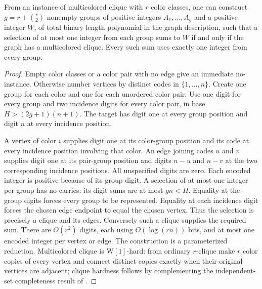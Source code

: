 \begin{lemma}\label{lem:groupsum59}
From an instance of multicolored clique with $r$ color classes, one can construct $g=r+\binom r2$ nonempty groups of positive integers $A_1,\ldots,A_g$ and a positive integer $W$, of total binary length polynomial in the graph description, such that a selection of at most one integer from each group sums to $W$ if and only if the graph has a multicolored clique. Every such sum uses exactly one integer from every group.
\end{lemma}
\begin{proof}
Empty color classes or a color pair with no edge give an immediate no-instance. Otherwise number vertices by distinct codes in $\{1,\ldots,n\}$. Create one group for each color and one for each unordered color pair. Use one digit for every group and two incidence digits for every color pair, in base $H>(2g+1)(n+1)$. The target has digit one at every group position and digit $n$ at every incidence position.

A vertex of color $i$ supplies digit one at its color-group position and its code at every incidence position involving that color. An edge joining codes $u$ and $v$ supplies digit one at its pair-group position and digits $n-u$ and $n-v$ at the two corresponding incidence positions. All unspecified digits are zero. Each encoded integer is positive because of its group digit. A selection of at most one integer per group has no carries: its digit sums are at most $gn<H$. Equality at the group digits forces every group to be represented. Equality at each incidence digit forces the chosen edge endpoint to equal the chosen vertex. Thus the selection is precisely a clique and its edges. Conversely such a clique supplies the required sum. There are $O(r^2)$ digits, each using $O(\log(rn))$ bits, and at most one encoded integer per vertex or edge. The construction is a parameterized reduction. Multicolored clique is $\mathrm{W}[1]$-hard: from ordinary $r$-clique make $r$ color copies of every vertex and connect distinct copies exactly when their original vertices are adjacent; clique hardness follows by complementing the independent-set completeness result of \citet{DowneyFellows1995b}.
\end{proof}

